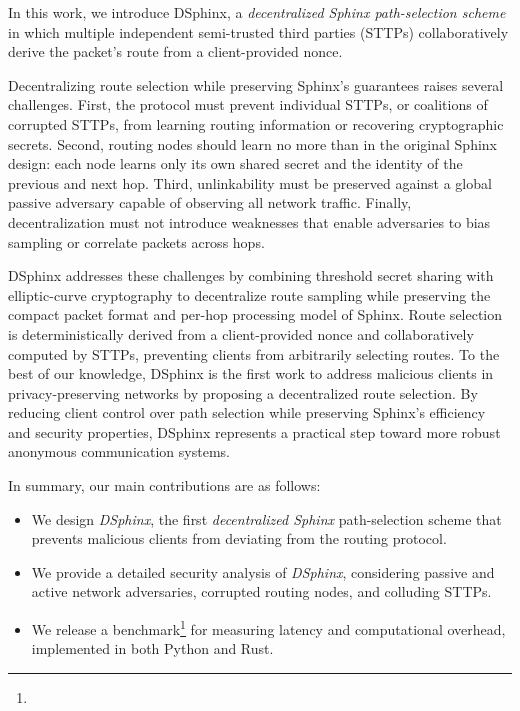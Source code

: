 In this work, we introduce DSphinx, a \emph{decentralized Sphinx path-selection scheme} in which multiple independent semi-trusted third parties (STTPs) collaboratively derive the packet's route from a client-provided nonce.

Decentralizing route selection while preserving Sphinx's guarantees raises several challenges.
First, the protocol must prevent individual STTPs, or coalitions of corrupted STTPs, from learning routing information or recovering cryptographic secrets. 
Second, routing nodes should learn no more than in the original Sphinx design: each node learns only its own shared secret and the identity of the previous and next hop. 
Third, unlinkability must be preserved against a global passive adversary capable of observing all network traffic. 
Finally, decentralization must not introduce weaknesses that enable adversaries to bias sampling or correlate packets across hops.

DSphinx addresses these challenges by combining threshold secret sharing with elliptic-curve cryptography to decentralize route sampling while preserving the compact packet format and per-hop processing model of Sphinx. 
Route selection is deterministically derived from a client-provided nonce and collaboratively computed by STTPs, preventing clients from arbitrarily selecting routes. 
To the best of our knowledge, DSphinx is the first work to address malicious clients in privacy-preserving networks by proposing a decentralized route selection.
By reducing client control over path selection while preserving Sphinx's efficiency and security properties, DSphinx represents a practical step toward more robust anonymous communication systems.

\medskip
\noindent In summary, our main contributions are as follows:
\begin{itemize}[topsep=1pt, itemsep=1pt]
	\item We design \emph{DSphinx}, the first \emph{decentralized Sphinx} path-selection scheme that prevents malicious clients from deviating from the routing protocol.
	\item We provide a detailed security analysis of \emph{DSphinx}, considering passive and active network adversaries, corrupted routing nodes, and colluding STTPs.
	\item We release a benchmark\footnote{\artifact} for measuring latency and computational overhead, implemented in both Python and Rust.
\end{itemize}
